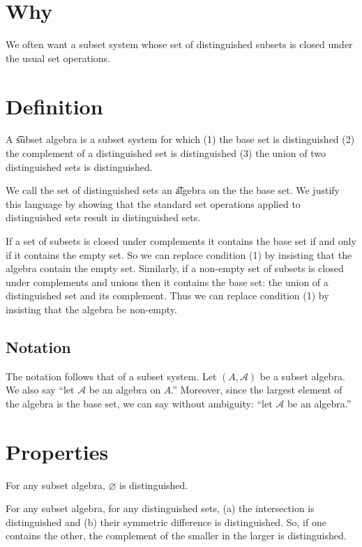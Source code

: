 
\section*{Why}

We often want a subset system whose set of distinguished subsets is closed under the usual set operations.

\section*{Definition}

A \t{subset algebra} is a subset system for which (1) the base set is distinguished (2) the complement of a distinguished set is distinguished (3) the union of two distinguished sets is distinguished.

We call the set of distinguished sets an \t{algebra} on the the base set.
We justify this language by showing that the standard set operations applied to distinguished sets result in distinguished sets.

If a set of subsets is closed under complements it contains the base set if and only if it contains the empty set.
So we can replace condition (1) by insisting that the algebra contain the empty set.
Similarly, if a non-empty set of subsets is closed under complements and unions then it contains the base set: the union of a distinguished set and its complement.
Thus we can replace condition (1) by insisting that the algebra be non-empty.

\subsection*{Notation}

The notation follows that of a subset system.
Let $(A, \mathcal{A} )$ be a subset algebra.
We also say ``let $\mathcal{A} $ be an algebra on $A$.''
Moreover, since the largest element of the algebra is the base set, we can say without ambiguity: ``let $\mathcal{A} $ be an algebra.''

\section*{Properties}

\begin{proposition}
For any subset algebra, $\varnothing$ is distinguished.
\end{proposition}

\begin{proposition}
For any subset algebra,
for any distinguished sets,
(a) the intersection is distinguished and
(b) their symmetric difference is distinguished.
So, if one contains the other, the complement
of the smaller in the larger is distinguished.
\end{proposition}

